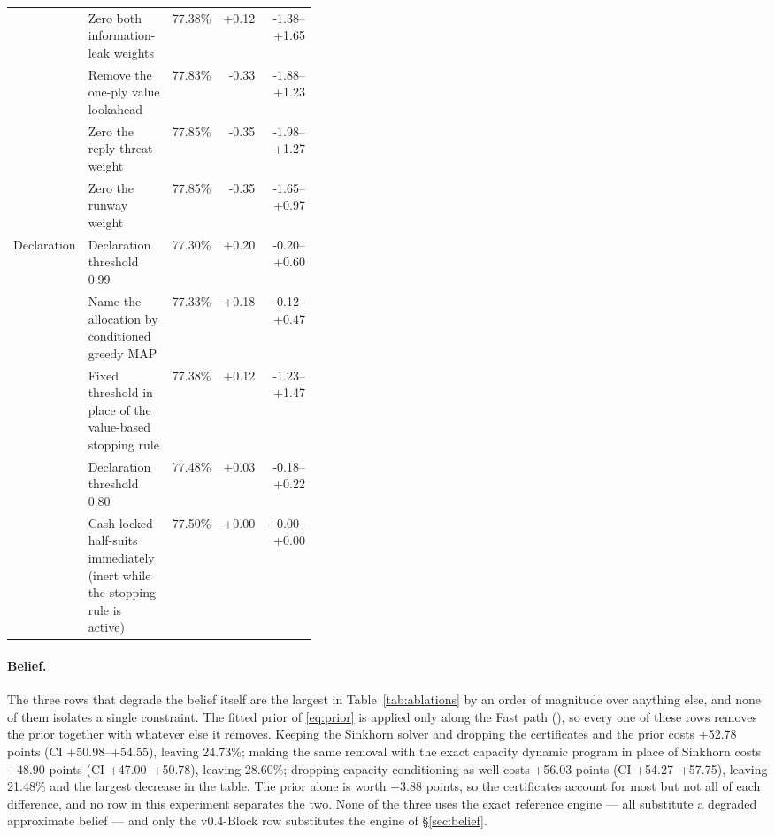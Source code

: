 \documentclass[11pt]{article}
\theoremstyle{definition}
\DeclareRobustCommand{\vblock}{\texorpdfstring{\mbox{v0.4-Block}}{v0.4-Block}}
\newcommand{\numAblPrior}{+3.88}
\newcommand{\numAblCFive}{+48.90}
\newcommand{\numAblCFiveCI}{+47.00--+50.78}
\newcommand{\numAblCFiveAbs}{28.60}
\newcommand{\numAblCFourAbs}{21.48}
\newcommand{\numAblSinkhornAbs}{24.73}
\newcommand{\numAblCFour}{+56.03}
\newcommand{\numAblCFourCI}{+54.27--+57.75}
\newcommand{\numAblSinkhorn}{+52.78}
\newcommand{\numAblSinkhornCI}{+50.98--+54.55}
\begin{document}
\begin{table}[!htbp]
\begin{tabular}{@{}l>{\raggedright\arraybackslash}p{0.40\linewidth}rrr@{}}
 & Zero both information-leak weights & 77.38\% & +0.12 & -1.38--+1.65 \\
 & Remove the one-ply value lookahead & 77.83\% & -0.33 & -1.88--+1.23 \\
 & Zero the reply-threat weight & 77.85\% & -0.35 & -1.98--+1.27 \\
 & Zero the runway weight & 77.85\% & -0.35 & -1.65--+0.97 \\
\addlinespace
Declaration & Declaration threshold 0.99 & 77.30\% & +0.20 & -0.20--+0.60 \\
 & Name the allocation by conditioned greedy MAP & 77.33\% & +0.18 & -0.12--+0.47 \\
 & Fixed threshold in place of the value-based stopping rule & 77.38\% & +0.12 & -1.23--+1.47 \\
 & Declaration threshold 0.80 & 77.48\% & +0.03 & -0.18--+0.22 \\
 & Cash locked half-suits immediately (inert while the stopping rule is active) & 77.50\% & +0.00 & +0.00--+0.00 \\
\bottomrule
\end{tabular}%
\end{table}

\paragraph{Belief.}
The three rows that degrade the belief itself are the largest in
Table~\ref{tab:ablations} by an order of magnitude over anything else, and none
of them isolates a single constraint. The fitted prior of \eqref{eq:prior} is
applied only along the Fast path (), so every one
of these rows removes the prior together with whatever else it removes. Keeping
the Sinkhorn solver and dropping the certificates and the prior costs
\numAblSinkhorn{} points (CI \numAblSinkhornCI{}), leaving \numAblSinkhornAbs\%;
making the same removal with the exact capacity dynamic program in place of
Sinkhorn costs \numAblCFive{} points (CI \numAblCFiveCI{}), leaving
\numAblCFiveAbs\%; dropping capacity conditioning as well costs \numAblCFour{}
points (CI \numAblCFourCI{}), leaving \numAblCFourAbs\% and the largest decrease
in the table. The prior alone is worth \numAblPrior{} points, so the certificates
account for most but not all of each difference, and no row in this experiment
separates the two. None of the three uses the exact reference engine --- all
substitute a degraded approximate belief --- and only the \vblock{} row
substitutes the engine of \S\ref{sec:belief}.
\end{document}
